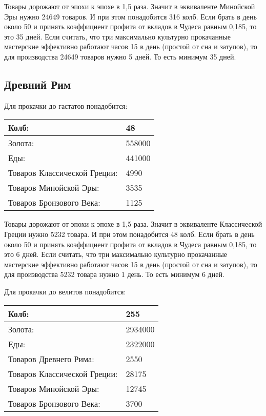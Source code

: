 Товары дорожают от эпохи к эпохе в 1,5 раза.
Значит в эквиваленте Минойской Эры нужно 24649 товаров.
И при этом понадобится 316 колб. Если брать в день около 50 и принять коэффициент профита от вкладов
в Чудеса равным 0,185, то это 35 дней.
Если считать, что три максимально культурно прокачанные мастерские эффективно работают часов 15 в день (простой от сна и затупов),
то для производства 24649 товаров нужно 5 дней.
То есть минимум 35 дней.



\subsection{Древний Рим}

Для прокачки до гастатов понадобится:

\begin{center}
    \begin{tabular}[h!]{|l|l|}
        \hline
        Колб:   & 48 \\\hline
        Золота: & 558000 \\\hline
        Еды:    & 441000 \\\hline
        Товаров Классической Греции: & 4990 \\\hline
        Товаров Минойской Эры: & 3535 \\\hline
        Товаров Бронзового Века: & 1125 \\\hline
    \end{tabular}
\end{center}

Товары дорожают от эпохи к эпохе в 1,5 раза.
Значит в эквиваленте Классической Греции нужно 5232 товара.
И при этом понадобится 48 колб. Если брать в день около 50 и принять коэффициент профита от вкладов
в Чудеса равным 0,185, то это 6 дней.
Если считать, что три максимально культурно прокачанные мастерские эффективно работают часов 15 в день (простой от сна и затупов),
то для производства 5232 товара нужно 1 день.
То есть минимум 6 дней.


Для прокачки до велитов понадобится:

\begin{center}
    \begin{tabular}[h!]{|l|l|}
        \hline
        Колб:   & 255 \\\hline
        Золота: & 2934000 \\\hline
        Еды:    & 2322000 \\\hline
        Товаров Древнего Рима: & 2550 \\\hline
        Товаров Классической Греции: & 28175 \\\hline
        Товаров Минойской Эры: & 12745 \\\hline
        Товаров Бронзового Века: & 3700 \\\hline
    \end{tabular}
\end{center}

